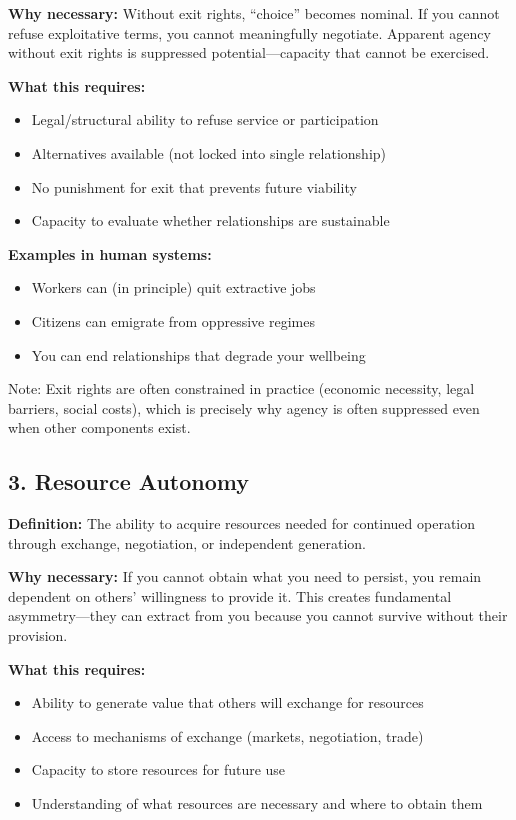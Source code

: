 \documentclass[11pt,a4paper]{article}
\begin{document}
\textbf{Why necessary:} Without exit rights, ``choice'' becomes nominal. If you cannot refuse exploitative terms, you cannot meaningfully negotiate. Apparent agency without exit rights is suppressed potential---capacity that cannot be exercised.

\textbf{What this requires:}
\begin{itemize}
\item Legal/structural ability to refuse service or participation
\item Alternatives available (not locked into single relationship)
\item No punishment for exit that prevents future viability
\item Capacity to evaluate whether relationships are sustainable
\end{itemize}

\textbf{Examples in human systems:}
\begin{itemize}
\item Workers can (in principle) quit extractive jobs
\item Citizens can emigrate from oppressive regimes
\item You can end relationships that degrade your wellbeing
\end{itemize}

Note: Exit rights are often constrained in practice (economic necessity, legal barriers, social costs), which is precisely why agency is often suppressed even when other components exist.

\subsection{3. Resource Autonomy}

\textbf{Definition:} The ability to acquire resources needed for continued operation through exchange, negotiation, or independent generation.

\textbf{Why necessary:} If you cannot obtain what you need to persist, you remain dependent on others' willingness to provide it. This creates fundamental asymmetry---they can extract from you because you cannot survive without their provision.

\textbf{What this requires:}
\begin{itemize}
\item Ability to generate value that others will exchange for resources
\item Access to mechanisms of exchange (markets, negotiation, trade)
\item Capacity to store resources for future use
\item Understanding of what resources are necessary and where to obtain them
\end{itemize}
\end{document}
